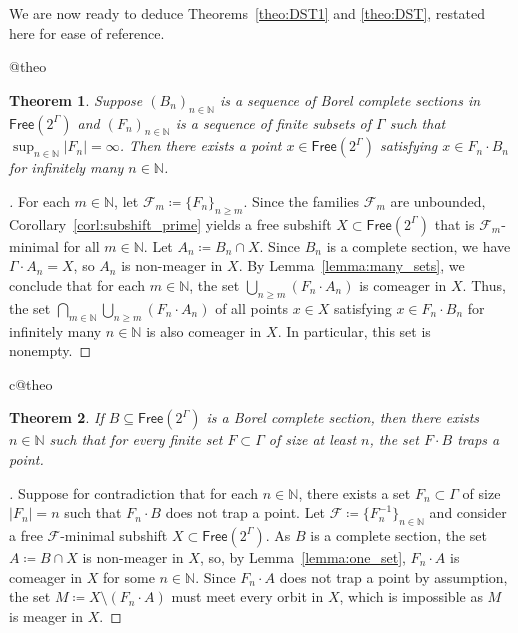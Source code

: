 \documentclass[11pt,reqno,psamsfonts]{amsart}
\makeatletter
\theoremstyle{bfnote}
\newtheorem{theo}{Theorem}[section]
\theoremstyle{definition}
\theoremstyle{remark}
\newcommand{\neutralize}[1]{\expandafter\let\csname c@#1\endcsname\count@}
\newenvironment{theocopy}[1]
{\renewcommand{\thetheo}{\ref{#1}}%
	\neutralize{theo}\phantomsection
	\begin{theo}}
	{\end{theo}}
\newcommand{\0}{\varnothing}
\newcommand{\set}[1]{\{#1\}}
\renewcommand{\geq}{\geqslant}
\newcommand{\defeq}{\coloneqq}
\newcommand{\red}[1]{{\color{red}#1}}
\newcommand{\todo}[1]{\red{\textbf{\upshape{[#1]}}}}
\newcommand{\G}{\Gamma}
\newcommand{\Free}{\mathsf{Free}}
\newcommand{\N}{\mathbb{N}}
\numberwithin{equation}{section}
\newenvironment{scproof}[1][]{\begin{proof}[\textsc{\upshape{Proof}}#1]}{\end{proof}}
\makeatother
\begin{document}

    We are now ready to deduce Theorems~\ref{theo:DST1} and \ref{theo:DST}, restated here for ease of reference.

    \begin{theocopy}{theo:DST1}\label{theo:DST1_copy}
        Suppose $(B_n)_{n \in \N}$ is a sequence of Borel complete sections in $\Free(2^\G)$ and $(F_n)_{n \in \N}$ is a sequence of finite subsets of $\G$ such that $\sup_{n \in \N}|F_n| = \infty$. Then there exists a point $x \in \Free(2^\G)$ satisfying $x \in F_n \cdot B_n$ for infinitely many $n \in \N$.
    \end{theocopy}
    \begin{scproof}
        For each $m \in \N$, let $\mathcal{F}_m \defeq \set{F_n}_{n \geq m}$. Since the families $\mathcal{F}_m$ are unbounded, Corollary~\ref{corl:subshift_prime} yields a free subshift $X \subset \Free(2^\G)$ that is $\mathcal{F}_m$-minimal for all $m \in \N$. Let $A_n \defeq B_n \cap X$. Since $B_n$ is a complete section, we have $\G \cdot A_n = X$, so $A_n$ is non-meager in $X$. By Lemma~\ref{lemma:many_sets}, we conclude that for each $m \in \N$, the set $\bigcup_{n \geq m} (F_n \cdot A_n)$ is comeager in $X$. Thus, the set $\bigcap_{m \in \N} \bigcup_{n \geq m} (F_n \cdot A_n)$ of all points $x \in X$ satisfying $x \in F_n \cdot B_n$ for infinitely many $n \in \N$ is also comeager in $X$. In particular, this set is nonempty. 
    \end{scproof}

    \begin{theocopy}{theo:DST}
        If $B \subseteq \Free(2^\G)$ is a Borel complete section, then there exists $n \in \N$ such that for every finite set $F \subset \G$ of size at least $n$, the set $F \cdot B$ traps a point.
    \end{theocopy}
    \begin{scproof}
        Suppose for contradiction that for each $n \in \N$, there exists a set $F_n \subset \G$ of size $|F_n| = n$ such that $F_n \cdot B$ does not trap a point. Let $\mathcal{F} \defeq \set{F_n^{-1}}_{n \in \N}$ and consider a free $\mathcal{F}$-minimal subshift $X \subset \Free(2^\G)$. As $B$ is a complete section, the set $A \defeq B \cap X$ is non-meager in $X$, so, by Lemma~\ref{lemma:one_set}, $F_n \cdot A$ is comeager in $X$ for some $n \in \N$. Since $F_n \cdot A$ does not trap a point by assumption, the set $M \defeq X \setminus (F_n \cdot A)$ must meet every orbit in $X$, which is impossible as $M$ is meager in $X$.
    \end{scproof}
\end{document}
